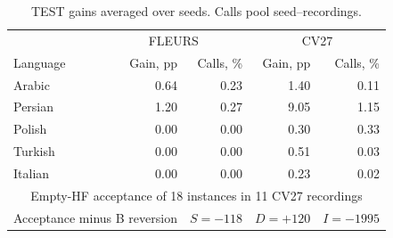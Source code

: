 \begin{table}[t]\centering\footnotesize
\caption{TEST gains averaged over seeds. Calls pool seed--recordings.}\label{tab:language}
\setlength{\tabcolsep}{5pt}\renewcommand{\arraystretch}{1.00}
\begin{tabular}{@{}lrrrr@{}}\toprule
 & \multicolumn{2}{c}{FLEURS} & \multicolumn{2}{c}{CV27}\\
Language & Gain, pp & Calls, \% & Gain, pp & Calls, \%\\\midrule
Arabic & 0.64 & 0.23 & 1.40 & 0.11\\
Persian & 1.20 & 0.27 & 9.05 & 1.15\\
Polish & 0.00 & 0.00 & 0.30 & 0.33\\
Turkish & 0.00 & 0.00 & 0.51 & 0.03\\
Italian & 0.00 & 0.00 & 0.23 & 0.02\\
\midrule\multicolumn{5}{c}{Empty-HF acceptance of 18 instances in 11 CV27 recordings}\\
\multicolumn{2}{l}{Acceptance minus B reversion} & $S=-118$ & $D=+120$ & $I=-1995$\\
\bottomrule\end{tabular}\end{table}
